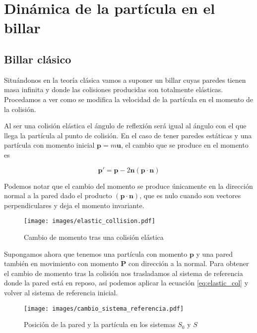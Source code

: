 %
%
%
%
\chapter{Dinámica de la partícula en el billar}

\section{Billar clásico}

Situándonos en la teoría clásica vamos a suponer un billar cuyas paredes tienen masa infinita y donde las colisiones producidas son totalmente elásticas. Procedamos a ver como se modifica la velocidad de la partícula en el momento de la colisión.

\vspace{3mm}

Al ser una colisión elástica el ángulo de reflexión será igual al ángulo con el que llega la partícula al punto de colisión. En el caso de tener paredes estáticas y una partícula con momento inicial \( \mathbf{p} = m\mathbf{u}\), el cambio que se produce en el momento es 

\begin{equation}\label{eq:elastic_col}
    \mathbf{p}' = \mathbf{p} - 2\mathbf{n}(\mathbf{p} \cdot \mathbf{n})
\end{equation}

Podemos notar que el cambio del momento se produce únicamente en la dirección normal a la pared dado el producto \( (\mathbf{p} \cdot \mathbf{n}) \), que es nulo cuando son vectores perpendiculares y deja el momento invariante.

\begin{figure}[H]
    \centering
    \texttt{[image: images/elastic\_collision.pdf]}
    \caption{Cambio de momento tras una colisión elástica}
    \label{fig:elastic_col}
\end{figure}

\vspace{3mm}

Supongamos ahora que tenemos una partícula con momento \( \mathbf{p} \) y una pared también en movimiento con momento \( \mathbf{P} \) con dirección a la normal. Para obtener el cambio de momento tras la colisión nos trasladamos al sistema de referencia donde la pared está en reposo, así podemos aplicar la ecuación \ref{eq:elastic_col} y volver al sistema de referencia inicial.

\begin{figure}[H]
    \centering
    \texttt{[image: images/cambio\_sistema\_referencia.pdf]}
    \caption{Posición de la pared y la partícula en los sistemas $S_0$ y $S$}
    \label{fig:cambio_referencia}
\end{figure}


